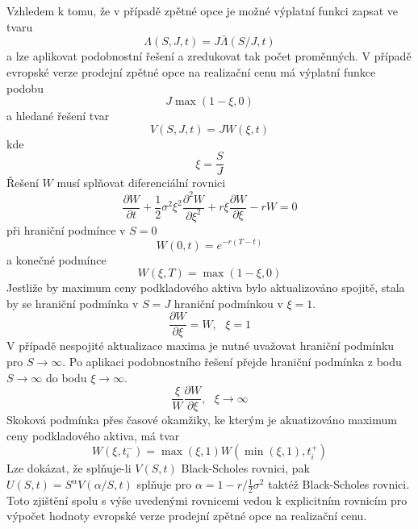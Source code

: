 \documentclass[a4paper]{book}
\begin{document}
Vzhledem k tomu, že v případě zpětné opce je možné výplatní funkci zapsat ve tvaru
\begin{equation*}
\Lambda(S, J, t) = J \bar{\Lambda}(S/J, t)
\end{equation*}
a lze aplikovat podobnostní řešení a zredukovat tak počet proměnných. V případě evropské verze prodejní zpětné opce na realizační cenu má výplatní funkce podobu
\begin{equation*}
J \max(1 - \xi, 0)
\end{equation*}
a hledané řešení tvar
\begin{equation*}
V(S,J,t) = JW(\xi,t)
\end{equation*}
kde
\begin{equation*}
\xi = \frac{S}{J}
\end{equation*}
Řešení $W$ musí splňovat diferenciální rovnici
\begin{equation*}
\frac{\partial W}{\partial t} + \frac{1}{2} \sigma^2 \xi^2 \frac{\partial^2 W}{\partial \xi^2} + r \xi \frac{\partial W}{\partial \xi} - r W = 0
\end{equation*}
při hraniční podmínce v $S = 0$
\begin{equation*}
W(0, t) = e^{-r(T-t)}
\end{equation*}
a konečné podmínce
\begin{equation*}
W(\xi, T) = \max(1 - \xi, 0)
\end{equation*}
Jestliže by maximum ceny podkladového aktiva bylo aktualizováno spojitě, stala by se hraniční podmínka v $S = J$ hraniční podmínkou v $\xi = 1$.
\begin{equation*}
\frac{\partial W}{\partial \xi} = W, ~~~ \xi = 1
\end{equation*}
V případě nespojité aktualizace maxima je nutné uvažovat hraniční podmínku pro $S \rightarrow \infty$. Po aplikaci podobnostního řešení přejde hraniční podmínka z bodu $S \rightarrow \infty$ do bodu $\xi \rightarrow \infty$.
\begin{equation*}
\frac{\xi}{W}\frac{\partial W}{\partial \xi}, ~~~ \xi \rightarrow \infty
\end{equation*}
Skoková podmínka přes časové okamžiky, ke kterým je akuatizováno maximum ceny podkladového aktiva, má tvar
\begin{equation*}
W(\xi, t_i^{-}) = \max(\xi, 1) W(\min(\xi, 1), t_i^{+})
\end{equation*}
Lze dokázat, že splňuje-li $V(S,t)$ Black-Scholes rovnici, pak $U(S,t) = S^{\alpha}V(\alpha/S,t)$ splňuje pro $\alpha = 1 - r/\frac{1}{2} \sigma^2$ taktéž Black-Scholes rovnici. Toto zjištění spolu s výše uvedenými rovnicemi vedou k explicitním rovnicím pro výpočet hodnoty evropské verze prodejní zpětné opce na realizační cenu.
\end{document}
